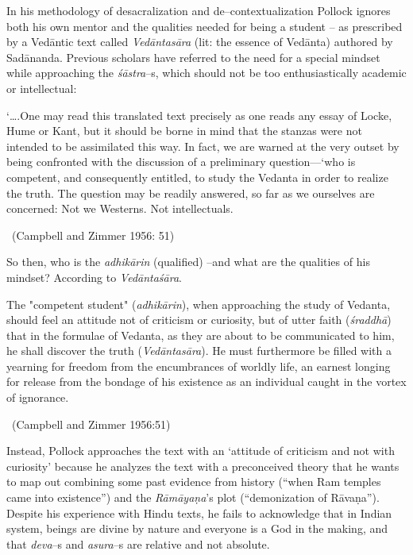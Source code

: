 In his methodology of desacralization and de–contextualization Pollock ignores both his own mentor and the qualities needed for being a student – as prescribed by a Vedāntic text called \textit{Vedāntasāra} (lit: the essence of Vedānta) authored by Sadānanda. Previous scholars have referred to the need for a special mindset while approaching the \textit{śāstra}–s, which should not be too enthusiastically academic or intellectual:

\begin{myquote}
‘….One may read this translated text precisely as one reads any essay of Locke, Hume or Kant, but it should be borne in mind that the stanzas were not intended to be assimilated this way. In fact, we are warned at the very outset by being confronted with the discussion of a preliminary question––‘who is competent, and consequently entitled, to study the Vedanta in order to realize the truth. The question may be readily answered, so far as we ourselves are concerned: Not we Westerns. Not intellectuals. 

~\hfill (Campbell and Zimmer 1956: 51)
\end{myquote}

So then, who is the \textit{adhikārin} (qualified) –and what are the qualities of his mindset? According to \textit{Vedāntaśāra}.

\begin{myquote}
The "competent student" (\textit{adhikārin}), when approaching the study of Vedanta, should feel an attitude not of criticism or curiosity, but of utter faith (\textit{śraddhā}) that in the formulae of Vedanta, as they are about to be communicated to him, he shall discover the truth (\textit{Vedāntasāra}). He must furthermore be filled with a yearning for freedom from the encumbrances of worldly life, an earnest longing for release from the bondage of his existence as an individual caught in the vortex of ignorance. 

~\hfill (Campbell and Zimmer 1956:51)
\end{myquote}

Instead, Pollock approaches the text with an ‘attitude of criticism and not with curiosity’ because he analyzes the text with a preconceived theory that he wants to map out combining some past evidence from history (“when Ram temples came into existence”) and the \textit{Rāmāyaṇa}’s plot (“demonization of Rāvaṇa”). Despite his experience with Hindu texts, he fails to acknowledge that in Indian system, beings are divine by nature and everyone is a God in the making, and that \textit{deva}–s and \textit{asura}–s are relative and not absolute.

